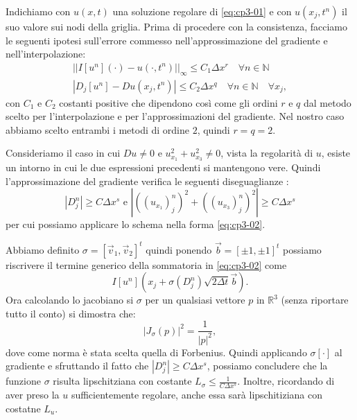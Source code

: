 Indichiamo con $u(x,t)$ una soluzione regolare di \eqref{eq:cp3-01} e con $u(x_j,t^n)$ il suo valore sui nodi della griglia.
Prima di procedere con la consistenza, facciamo le seguenti ipotesi sull'errore commesso nell'approssimazione del gradiente e nell'interpolazione:
\begin{gather}
\label{eq:cp3-04}
||I[u^n](\cdot)-u(\cdot,t^n)||_{\infty}\le C_1\Delta x^r\quad\forall n\in\mathbb{N} \\
\label{eq:cp3-05}
|D_j[u^n]-Du(x_j,t^n)|\le C_2\Delta x^q\quad\forall n\in\mathbb{N}\quad\forall x_j, 
\end{gather}
con $C_1$ e $C_2$ costanti positive che dipendono così come gli ordini $r$ e $q$ dal metodo scelto per l'interpolazione e per l'approssimazioni del gradiente. Nel nostro caso abbiamo scelto entrambi i metodi di ordine $2$, quindi $r=q=2$.

Consideriamo il caso in cui $Du\ne 0$ e $u_{x_1}^2+u_{x_3}^2\ne 0$, vista la regolarità di $u$, esiste un intorno in cui le due espressioni precedenti si mantengono vere. Quindi l'approssimazione del gradiente verifica le seguenti diseguaglianze :
\[
|D_j^n|\ge C\Delta x^s\text{ e }|((u_{x_1})_j^n)^2+((u_{x_3})_j^n)^2|\ge C\Delta x^s
\]
per cui possiamo applicare lo schema nella forma \eqref{eq:cp3-02}.
\begin{osservazione}
Abbiamo definito $\sigma=[\vec{v}_1,\vec{v}_2]^t$ quindi ponendo  $\vec{b}=[\pm1,\pm1]^t$ possiamo riscrivere il termine generico della sommatoria in \eqref{eq:cp3-02} come
\[
I[u^n](x_j+\sigma(D_j^n)\sqrt{2\Delta t}\vec{b}).
\]
Ora calcolando lo jacobiano si $\sigma$ per un qualsiasi vettore $p$ in $\mathbb{R}^3$ (senza riportare tutto il conto) si dimostra che:
\[
\left|J_{\sigma}(p)\right|^2=\frac{1}{|p|^2},
\]
dove come norma è stata scelta quella di Forbenius. Quindi applicando $\sigma[\cdot]$ al gradiente e sfruttando il fatto che $|D_j^n|\ge C\Delta x^s$, possiamo concludere che la funzione $\sigma$ risulta lipschitziana con costante $L_{\sigma}\le\frac{1}{C\Delta x^s}$.
Inoltre, ricordando di aver preso la $u$ sufficientemente regolare, anche essa sarà lipschitiziana con costatne $L_u$.
\end{osservazione}

